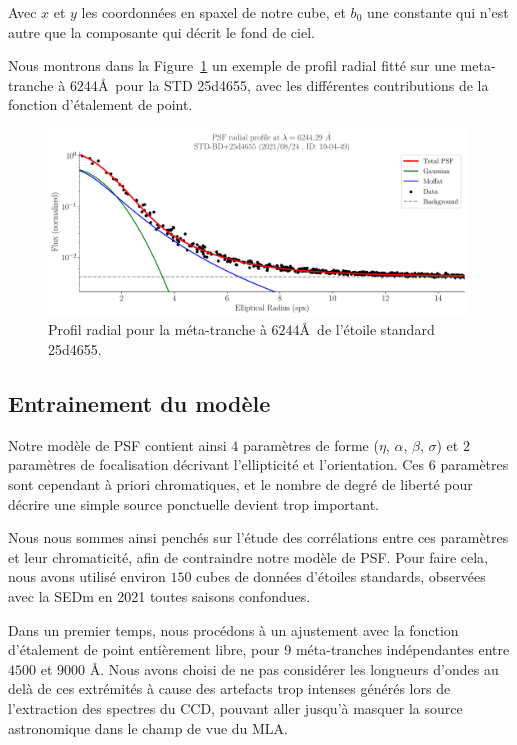 \documentclass[../main/main.tex]{subfiles}
\begin{document}
Avec $x$ et $y$ les coordonnées en spaxel de notre cube, et $b_{0}$ une
constante qui n'est autre que la composante qui décrit le fond de ciel.

Nous montrons dans la Figure~\ref{fig:radialprofile} un exemple de
profil radial fitté sur une meta-tranche à $6244$\AA\ pour la STD
25d4655, avec les différentes contributions de la fonction
d'étalement de point.
\begin{figure}[ht]
  \centering
  \includegraphics[width=0.99\textwidth]{../figures/06_irf/psfprofile.pdf}
  \caption[Exemple de profil radial d'un étoile standard]{Profil radial
    pour la méta-tranche à $6244$\AA\ de l'étoile standard 25d4655.}
  \label{fig:radialprofile}
\end{figure}

\subsection{Entrainement du modèle}\label{ssec:psftraining}

Notre modèle de PSF contient ainsi $4$ paramètres de forme ($\eta$,
$\alpha$, $\beta$, $\sigma$) et $2$ paramètres de focalisation décrivant
l'ellipticité et l'orientation. Ces $6$ paramètres sont cependant à
priori chromatiques, et le nombre de degré de liberté pour décrire une
simple source ponctuelle devient trop important.

Nous nous sommes ainsi penchés sur l'étude des corrélations entre ces
paramètres et leur chromaticité, afin de contraindre notre modèle de
PSF. Pour faire cela, nous avons utilisé environ $150$ cubes de
données d'étoiles standards, observées avec la SEDm en 2021 toutes saisons
confondues. 

Dans un premier temps, nous procédons à un ajustement avec la fonction
d'étalement de point entièrement libre, pour 9 méta-tranches indépendantes
entre $4500$ et $9000$ \AA. Nous avons choisi de ne pas considérer les
longueurs d'ondes au delà de ces extrémités à cause des artefacts trop intenses
générés lors de l'extraction des spectres du CCD, pouvant aller jusqu'à
masquer la source astronomique dans le champ de vue du MLA.
\end{document}
